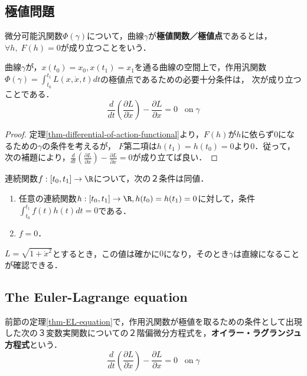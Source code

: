 \documentclass[uplatex, 12pt, dvipdfmx]{jsreport}
\begin{document}
\subsection{極値問題}

\begin{definition}[extremal]
    微分可能汎関数$\Phi(\gamma)$について，曲線$\gamma$が\textbf{極値関数／極値点}であるとは，$\forall h,\; F(h)=0$が成り立つことをいう．
\end{definition}

\begin{theorem}\label{thm-EL-equation}
    曲線$\gamma$が，$x(t_0)=x_0,x(t_1)=x_1$を通る曲線の空間上で，作用汎関数$\Phi(\gamma)=\int^{t_1}_{t_0}L(x,\dot{x},t)dt$の極値点であるための必要十分条件は，
    次が成り立つことである．
    \[ \frac{d}{dt}\left(\frac{\partial L}{\partial\dot{x}}\right) - \frac{\partial L}{\partial x} = 0\;\;\;\mathrm{on\;}\gamma \]
\end{theorem}
\begin{proof}
    定理\ref{thm-differential-of-action-functional}より，$F(h)$が$h$に依らず$0$になるための$\gamma$の条件を考えるが，
    $F$第二項は$h(t_1)=h(t_0)=0$より$0$．従って，次の補題により，$\frac{d}{dt}\left(\frac{\partial L}{\partial\dot{x}}\right) - \frac{\partial L}{\partial x} = 0$が成り立てば良い．
\end{proof}

\begin{lemma}
    連続関数$f:[t_0,t_1]\to\R$について，次の２条件は同値．
    \begin{enumerate}
        \item 任意の連続関数$h:[t_0,t_1]\to\R, h(t_0)=h(t_1)=0$に対して，条件$\int^{t_1}_{t_0}f(t)h(t)dt=0$である．
        \item $f=0$．
    \end{enumerate}
\end{lemma}

\begin{example}
    $L=\sqrt{1+\dot{x}^2}$とするとき，この値は確かに$0$になり，そのとき$\gamma$は直線になることが確認できる．
\end{example}

\subsection{The Euler-Lagrange equation}

\begin{definition}
    前節の定理\ref{thm-EL-equation}で，作用汎関数が極値を取るための条件として出現した次の３変数実関数についての２階偏微分方程式を，\textbf{オイラー・ラグランジュ方程式}という．
    \[ \frac{d}{dt}\left(\frac{\partial L}{\partial\dot{x}}\right) - \frac{\partial L}{\partial x} = 0\;\;\;\mathrm{on\;}\gamma \]
\end{definition}
\end{document}
